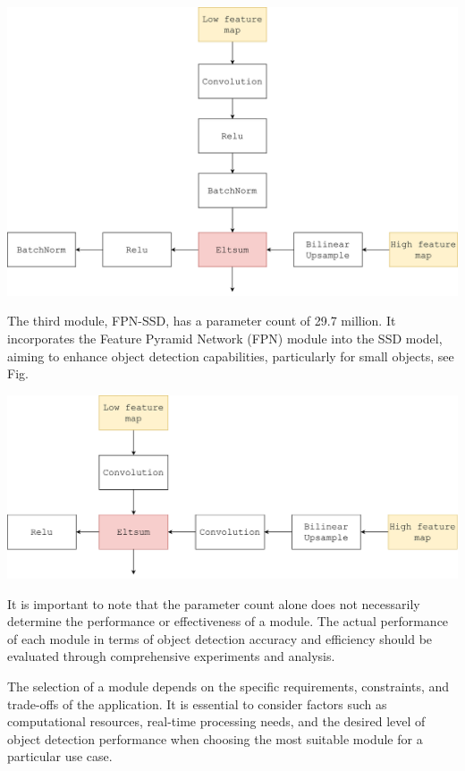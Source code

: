 \documentclass[a4paper]{article}
\begin{document}
	\begin{center}
		\includegraphics[width=0.95\linewidth]{../fig/Module_b}
		\label{moduleb}
	\end{center}
	
	The third module, FPN-SSD, has a parameter count of 29.7 million. It incorporates the Feature Pyramid Network (FPN) module into the SSD model, aiming to enhance object detection capabilities, particularly for small objects, see Fig.
	
	\begin{center}
		\includegraphics[width=0.95\linewidth]{../fig/Module_c}
		\label{modulec}
	\end{center}
	
	It is important to note that the parameter count alone does not necessarily determine the performance or effectiveness of a module. The actual performance of each module in terms of object detection accuracy and efficiency should be evaluated through comprehensive experiments and analysis.
	
	The selection of a module depends on the specific requirements, constraints, and trade-offs of the application. It is essential to consider factors such as computational resources, real-time processing needs, and the desired level of object detection performance when choosing the most suitable module for a particular use case.
		
\end{document}
